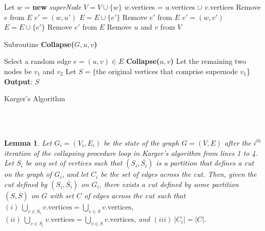 \documentclass[psamsfonts, 10pt]{amsart}
\newtheorem{lem}[thm]{Lemma}
\theoremstyle{definition}
\theoremstyle{remark}
\numberwithin{equation}{section}
\newcommand{\creturn}{\mbox{}\\}
\begin{document}
\begin{algorithm}[H]
    
    
\BlankLine\BlankLine
{}
Let $w$ = {\bf new} {\it superNode}\;
$V = V \cup \{w\}$\; 
$w$.vertices = $u$.vertices $\cup$ $v$.vertices\;
 {
	Remove $e$ from $E$\;
}
 {
$e' = (w, u')$\;
$E = E \cup \{e'\}$\;
Remove $e'$ from $E$\;
}
 {
$e' = (w, v')$\;
$E = E \cup \{e'\}$\;
Remove $e'$ from $E$\;
}
Remove $u$ and $v$ from $V$\;
\caption{Subroutine {\bf Collapse($G,u,v$)}}
\end{algorithm}
\begin{algorithm}[H]
 {
	Select a random edge $e = (u,v) \in E$\;
	\bf{Collapse}($u,v$)\;
}
Let the remaining two nodes be $v_1$ and $v_2$\;
Let $S = \{$the original vertices that comprise supernode $v_1$\}\;
{\bf Output}: $S$\;
\caption{Karger's Algorithm}
\end{algorithm}
\creturn\\

\begin{lem}
Let $G_i = (V_i, E_i)$ be the state of the graph $G = (V, E)$ after the $i^{th}$ iteration of the collapsing procedure loop in Karger's algorithm from lines 1 to 4. Let $S_i$ be any set of vertices such that $(S_i, \overline{S_i})$ is a partition that defines a cut on the graph of $G_i$, and let $C_i$ be the set of edges across the cut. Then, given the cut defined by $(S_i, \overline{S_i})$ on $G_i$, there exists a cut defined by some partition $(S, \overline{S})$ on $G$ with set $C$ of edges across the cut such that $(i) \ \bigcup_{v \in S_i} v.\text{vertices} = \bigcup_{v \in S} v.\text{vertices}$, $(ii) \ \bigcup_{v \in \overline{S_i}} v.\text{vertices} = \bigcup_{v \in \overline{S}} v.\text{vertices}$, and $(iii) \ \lvert C_i \rvert = \lvert C \rvert$.
\end{lem}
\end{document}
